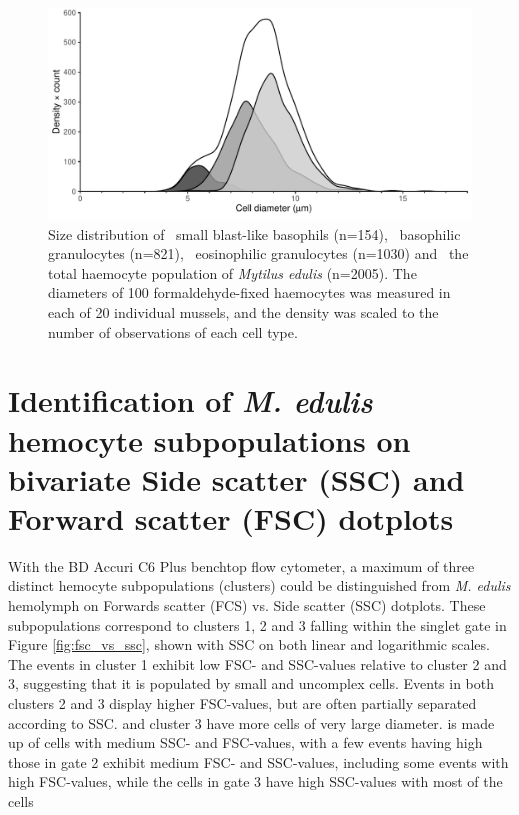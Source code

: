 \begin{figure}[!ht]
    \centering
    \includegraphics[width=1.0\textwidth]{figures/Anatomy/diameters scaled density plot.pdf}
    \caption{Size distribution of \protect\dimgraybox \ small blast-like basophils (n=154), \protect\lightgraybox \ basophilic granulocytes (n=821), \protect\lysegraabox \ eosinophilic granulocytes (n=1030) and \protect\whitebox \ the total haemocyte population of \emph{Mytilus edulis} (n=2005). The diameters of 100 formaldehyde-fixed haemocytes was measured in each of 20 individual mussels, and the density was scaled to the number of observations of each cell type.}
    \label{fig:Diameters}
\end{figure}


\section{Identification of \emph{M. edulis} hemocyte subpopulations on bivariate Side scatter (SSC) and Forward scatter (FSC) dotplots}
With the BD Accuri C6 Plus benchtop flow cytometer, a maximum of three distinct hemocyte subpopulations (clusters) could be distinguished from \emph{M. edulis} hemolymph on Forwards scatter (FCS) vs. Side scatter (SSC) dotplots. These subpopulations correspond to clusters 1, 2 and 3 
 falling within the singlet gate in Figure \ref{fig:fsc_vs_ssc}, shown with SSC on both linear and logarithmic scales. The events in cluster 1 exhibit low FSC- and SSC-values relative to cluster 2 and 3, suggesting that it is populated by small and uncomplex cells. Events in both clusters 2 and 3 display higher FSC-values, but are often partially separated according to SSC.  and cluster 3 have more cells of very large diameter. is made up of cells with medium SSC- and FSC-values, with a few events having high those in gate 2 exhibit medium FSC- and SSC-values, including some events with high FSC-values, while the cells in gate 3 have high SSC-values with most of the cells

